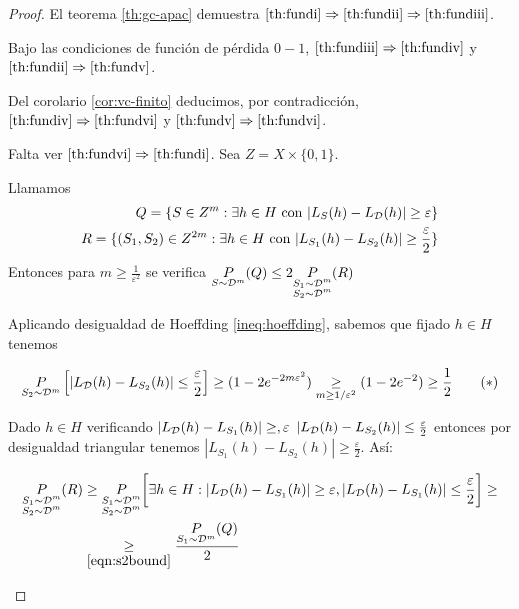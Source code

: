 \begin{proof}
 El teorema \ref{th:gc-apac} demuestra $\eqref{th:fundi} \Rightarrow \eqref{th:fundii} \Rightarrow \eqref{th:fundiii}$.
 
 Bajo las condiciones de función de pérdida $0-1$, $\eqref{th:fundiii} \Rightarrow \eqref{th:fundiv}$ y 
 $\eqref{th:fundii} \Rightarrow \eqref{th:fundv}$. 
 
 Del corolario \ref{cor:vc-finito} deducimos, por contradicción, $\eqref{th:fundiv} \Rightarrow \eqref{th:fundvi}$
 y $\eqref{th:fundv} \Rightarrow \eqref{th:fundvi}$.
 
 Falta ver $\eqref{th:fundvi} \Rightarrow \eqref{th:fundi}$. Sea $Z = X \times \{0,1\}$.
 
 Llamamos \begin{align*} 
	   Q = \{S \in Z^m : \exists h\in H \textrm{ con } |L_S(h) - L_{\mathcal{D}}(h)| \ge \varepsilon\}\\
           R = \{(S_1, S_2) \in Z^{2m}: \exists h\in H \textrm{ con } |L_{S_1}(h) - L_{S_2}(h)| \ge \frac{\varepsilon}{2}\}\\
          \end{align*}
 Entonces para $m\ge \frac{1}{\varepsilon^2}$ se verifica $\underset{S\sim \mathcal{D}^m}{P}(Q) \le 2 \underset{\begin{subarray}{c} S_1 \sim \mathcal{D}^{m} \\ S_2 \sim\mathcal{D}^m \end{subarray}}{P}(R)$
 
 \begin{subenv}
 Aplicando desigualdad de Hoeffding \ref{ineq:hoeffding}, sabemos que fijado $h\in H$ tenemos 

 \begin{equation}
  \mdosprob \left[|L_{\dist}(h) - L_{S_2}(h)| \le \frac{\varepsilon}{2} \right] \ge 
   (1 - 2e^{-2m\varepsilon^2}) \underset{m\ge 1/\varepsilon^2}{\ge} (1 - 2e^{-2}) \ge \frac{1}{2}
  \tag{\mbox{$\ast$}}\label{eqn:s2bound}
 \end{equation}

 Dado $h\in H$ verificando $|L_{\mathcal{D}}(h) - L_{S_1}(h)| \ge, \varepsilon$ $|L_{\mathcal{D}}(h) - L_{S_2}(h)| \le \frac{\varepsilon}{2}$
 entonces por desigualdad triangular tenemos $|L_{S_1}(h) - L_{S_2}(h)| \ge \frac{\varepsilon}{2}$. Así:
 
 \begin{align}
  \underset{\begin{subarray}{c} S_1 \sim \mathcal{D}^{m} \\ S_2 \sim\mathcal{D}^m \end{subarray}}{P}(R) &\ge \underset{\begin{subarray}{c} S_1 \sim \mathcal{D}^{m} \\ S_2 \sim\mathcal{D}^m \end{subarray}}{P} \bigg[ \exists h \in H: |L_{\mathcal{D}}(h) - L_{S_1}(h)| 
		 \ge \varepsilon, |L_{\mathcal{D}}(h) - L_{S_1}(h)| \le \frac{\varepsilon}{2} \bigg] \ge \nonumber\\
             &\underset{\eqref{eqn:s2bound}}{\ge} \frac{\underset{S_1\sim \mathcal{D}^m}{P}(Q)}{2}
 \end{align} 
 \end{subenv}
 

\end{proof}
